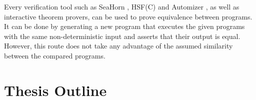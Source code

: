 
Every verification tool such as SeaHorn \cite{DBLP:conf/cav/GurfinkelKKN15}, HSF(C) \cite{DBLP:conf/tacas/GrebenshchikovGLPR12} and Automizer \cite{DBLP:conf/cav/HeizmannHP13}, as well as interactive theorem provers, can be used to prove equivalence between programs. It can be done by generating a new program that executes the given programs with the same non-deterministic input and asserts that their output is equal. However, this route does not take any advantage of the assumed similarity between the compared programs.

\section{Thesis Outline}
